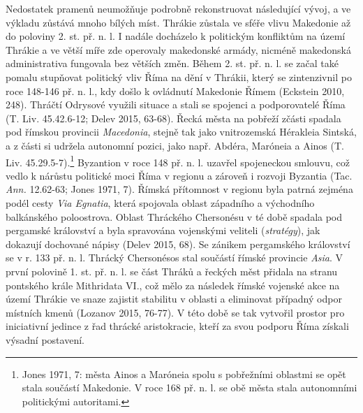 Nedostatek pramenů neumožňuje podrobně rekonstruovat následující vývoj, a ve výkladu zůstává mnoho bílých míst. Thrákie zůstala ve sféře vlivu Makedonie až do poloviny 2. st. př. n. l. I nadále docházelo k politickým konfliktům na území Thrákie a ve větší míře zde operovaly makedonské armády, nicméně makedonská administrativa fungovala bez větších změn. Během 2. st. př. n. l. se začal také pomalu stupňovat politický vliv Říma na dění v Thrákii, který se zintenzivnil po roce 148-146 př. n. l., kdy došlo k ovládnutí Makedonie Římem (Eckstein 2010, 248). Thráčtí Odrysové využili situace a stali se spojenci a podporovatelé Říma (T. Liv. 45.42.6-12; Delev 2015, 63-68). Řecká města na pobřeží zčásti spadala pod římskou provincii {\em Macedonia}, stejně tak jako vnitrozemská Hérakleia Sintská, a z části si udržela autonomní pozici, jako např. Abdéra, Maróneia a Ainos (T. Liv. 45.29.5-7).\footnote{Jones 1971, 7: města Ainos a Maróneia spolu s pobřežními oblastmi se opět stala součástí Makedonie. V roce 168 př. n. l. se obě města stala autonomními politickými autoritami.} Byzantion v roce 148 př. n. l. uzavřel spojeneckou smlouvu, což vedlo k nárůstu politické moci Říma v regionu a zároveň i rozvoji Byzantia (Tac. {\em Ann.} 12.62-63; Jones 1971, 7). Římská přítomnost v regionu byla patrná zejména podél cesty {\em Via Egnatia}, která spojovala oblast západního a východního balkánského poloostrova. Oblast Thráckého Chersonésu v té době spadala pod pergamské království a byla spravována vojenskými veliteli ({\em stratégy}), jak dokazují dochované nápisy (Delev 2015, 68). Se zánikem pergamského království se v r. 133 př. n. l. Thrácký Chersonésos stal součástí římské provincie {\em Asia}. V první polovině 1. st. př. n. l. se část Thráků a řeckých měst přidala na stranu pontského krále Mithridata VI., což mělo za následek římské vojenské akce na území Thrákie ve snaze zajistit stabilitu v oblasti a eliminovat případný odpor místních kmenů (Lozanov 2015, 76-77). V této době se tak vytvořil prostor pro iniciativní jedince z řad thrácké aristokracie, kteří za svou podporu Říma získali výsadní postavení.

